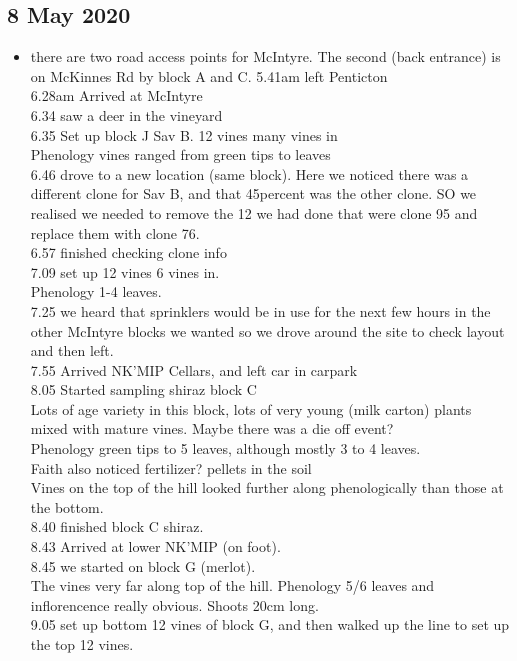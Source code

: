 \documentclass[11pt,letter]{article}
\newenvironment{smitemize}{
\begin{itemize}
  \setlength{\itemsep}{0pt}
  \setlength{\parskip}{0.8pt}
  \setlength{\parsep}{0pt}}
{\end{itemize}
}
\begin{document}
\subsection{8 May 2020}
\begin{smitemize}
\item there are two road access points for McIntyre. The second (back entrance) is on McKinnes Rd by block A and C.  
5.41am left Penticton \\
6.28am Arrived at McIntyre\\ 
6.34 saw a deer in the vineyard\\
6.35 Set up block J Sav B. 12 vines many vines in\\
Phenology vines ranged from green tips to leaves\\
6.46 drove to a new location (same block). Here we noticed there was a different clone for Sav B, and that 45percent was the other clone. SO we realised we needed to remove the 12 we had done that were clone 95 and replace them with clone 76. \\
6.57 finished checking clone info\\
7.09 set up 12 vines 6 vines in.\\
Phenology 1-4 leaves. \\
7.25 we heard that sprinklers would be in use for the next few hours in the other McIntyre blocks we wanted so we drove around the site to check layout and then left. \\
7.55 Arrived NK'MIP Cellars, and left car in carpark \\
8.05 Started sampling shiraz block C\\
Lots of age variety in this block, lots of very young (milk carton) plants mixed with mature vines. Maybe there was a die off event? \\
Phenology green tips to 5 leaves, although mostly 3 to 4 leaves. \\
Faith also noticed fertilizer? pellets in the soil\\
Vines on the top of the hill looked further along phenologically than those at the bottom.\\
8.40 finished block C shiraz.\\
8.43 Arrived at lower NK'MIP (on foot).\\ 
8.45 we started on block G (merlot). \\
The vines very far along top of the hill. Phenology 5/6 leaves and inflorencence really obvious. Shoots 20cm long.\\
9.05 set up bottom 12 vines of block G, and then walked up the line to set up the top 12 vines.\\

\end{smitemize}
\end{document}
